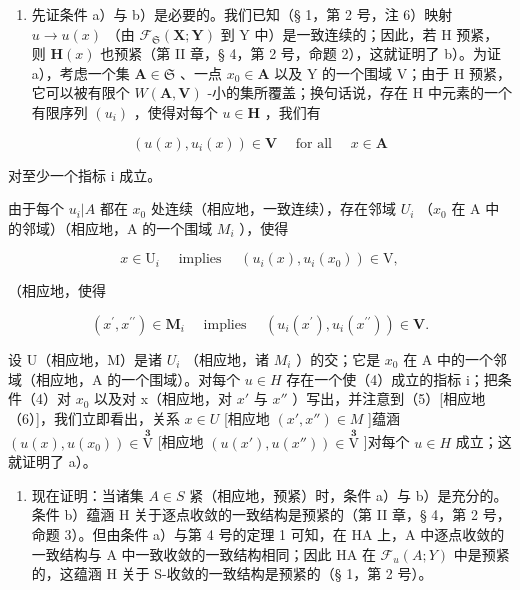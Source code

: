 \begin{enumerate}
\def\labelenumi{\arabic{enumi})}
\tightlist
\item
  先证条件 a）与 b）是必要的。我们已知（§ 1，第 2 号，注 6）映射 \(u \to u(x)\) （由 \(\mathcal{F}_{\mathfrak{S}}(\mathbf{X};\mathbf{Y})\) 到 Y 中）是一致连续的；因此，若 H 预紧，则 \(\mathbf{H}(x)\) 也预紧（第 II 章，§ 4，第 2 号，命题 2），这就证明了 b）。为证 a），考虑一个集 \(\mathbf{A} \in \mathfrak{S}\) 、一点 \(x_0 \in \mathbf{A}\) 以及 Y 的一个围域 V；由于 H 预紧，它可以被有限个 \(W(\mathbf{A},\mathbf{V})\) -小的集所覆盖；换句话说，存在 H 中元素的一个有限序列 \((u_i)\) ，使得对每个 \(u \in \mathbf{H}\) ，我们有
\end{enumerate}

\[
(u (x), u _ {i} (x)) \in \mathbf {V} \quad \text { for   all } \quad x \in \mathbf {A}\tag{4}
\]

对至少一个指标 i 成立。

由于每个 \(u_{i}|A\) 都在 \(x_{0}\) 处连续（相应地，一致连续），存在邻域 \(U_{i}\) （\(x_{0}\) 在 A 中的邻域）（相应地，A 的一个围域 \(M_{i}\) ），使得

\[
x \in \mathrm{U} _ {i} \quad \text { implies } \quad (u _ {i} (x), u _ {i} (x _ {0})) \in \mathrm{V},\tag{5}
\]

（相应地，使得

\[
(x ^ {\prime}, x ^ {\prime \prime}) \in \mathbf {M} _ {i} \quad \text { implies } \quad (u _ {i} (x ^ {\prime}), u _ {i} (x ^ {\prime \prime})) \in \mathbf {V}.\tag{6}
\]

设 U（相应地，M）是诸 \(U_{i}\) （相应地，诸 \(M_{i}\) ）的交；它是 \(x_{0}\) 在 A 中的一个邻域（相应地，A 的一个围域）。对每个 \(u \in H\) 存在一个使（4）成立的指标 i；把条件（4）对 \(x_{0}\) 以及对 x（相应地，对 \(x'\) 与 \(x''\) ）写出，并注意到（5）{[}相应地（6）{]}，我们立即看出，关系 \(x \in U\) {[}相应地 \((x', x'') \in M\) {]}蕴涵 \((u(x), u(x_{0})) \in \overset{\mathbf{3}}{\mathrm{V}}\) {[}相应地 \((u(x'), u(x'')) \in \overset{\mathbf{3}}{\mathrm{V}}\) {]}对每个 \(u \in H\) 成立；这就证明了 a）。

\begin{enumerate}
\def\labelenumi{\arabic{enumi})}
\setcounter{enumi}{1}
\tightlist
\item
  现在证明：当诸集 \(A \in S\) 紧（相应地，预紧）时，条件 a）与 b）是充分的。条件 b）蕴涵 H 关于逐点收敛的一致结构是预紧的（第 II 章，§ 4，第 2 号，命题 3）。但由条件 a）与第 4 号的定理 1 可知，在 H\textbar A 上，A 中逐点收敛的一致结构与 A 中一致收敛的一致结构相同；因此 H\textbar A 在 \(\mathcal{F}_{u}(A; Y)\) 中是预紧的，这蕴涵 H 关于 S-收敛的一致结构是预紧的（§ 1，第 2 号）。
\end{enumerate}

